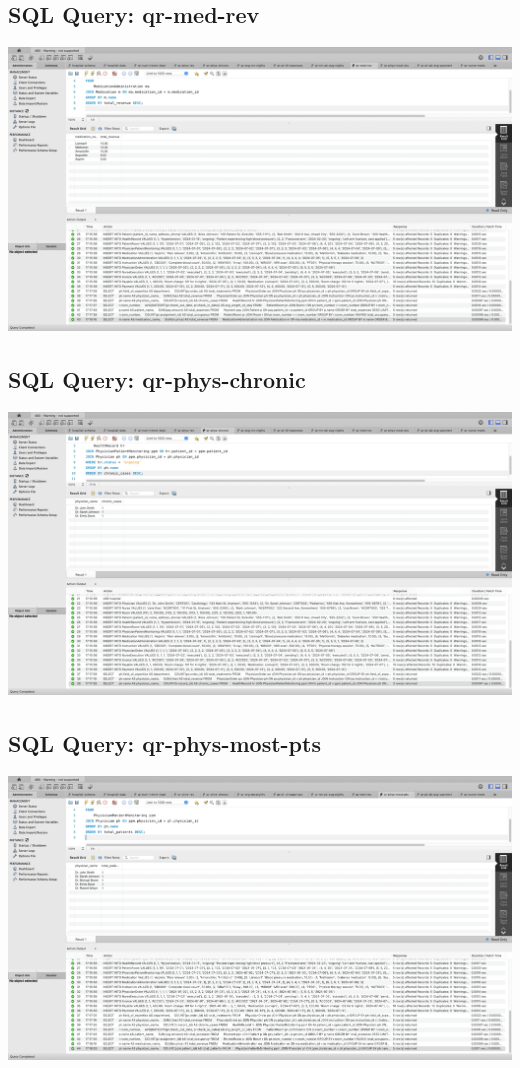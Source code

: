 \documentclass[a4paper,11pt]{article}
\theoremstyle{mytheor}
\begin{document}
\subsection{SQL Query: qr-med-rev}
\includegraphics[width=\textwidth]{Screenshots/SCR-20240727-pera.png}

\subsection{SQL Query: qr-phys-chronic}
\includegraphics[width=\textwidth]{Screenshots/SCR-20240727-pejp.png}

\subsection{SQL Query: qr-phys-most-pts}
\includegraphics[width=\textwidth]{Screenshots/SCR-20240727-pesr.png}
\end{document}
